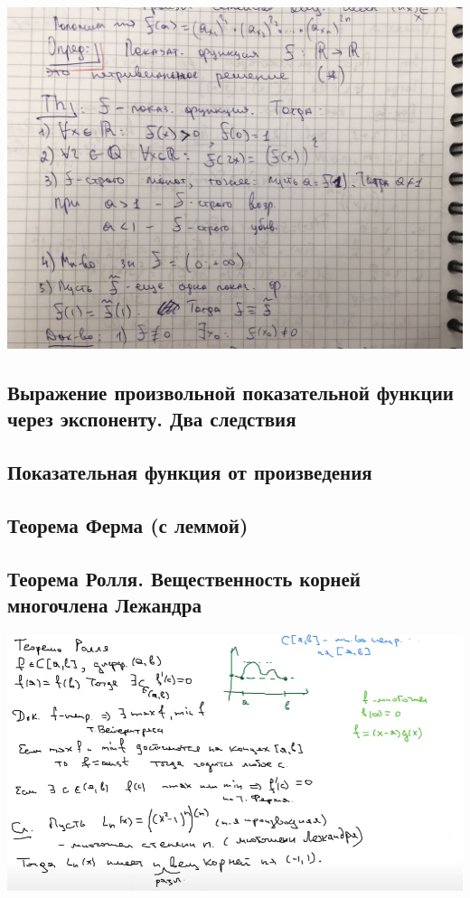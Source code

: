\includegraphics[scale=0.5]{Images/photo_2021-01-26_09-51-22.jpg}

\newpage
\subsection{Выражение произвольной показательной функции через экспоненту. Два следствия}

\newpage
{}
\subsection{Показательная функция от произведения}

\newpage
{}
\subsection{Теорема Ферма (с леммой)}

\newpage
{}
\subsection{Теорема Ролля. Вещественность корней многочлена Лежандра}

\includegraphics[scale=0.7]{Images/ролль.png}

